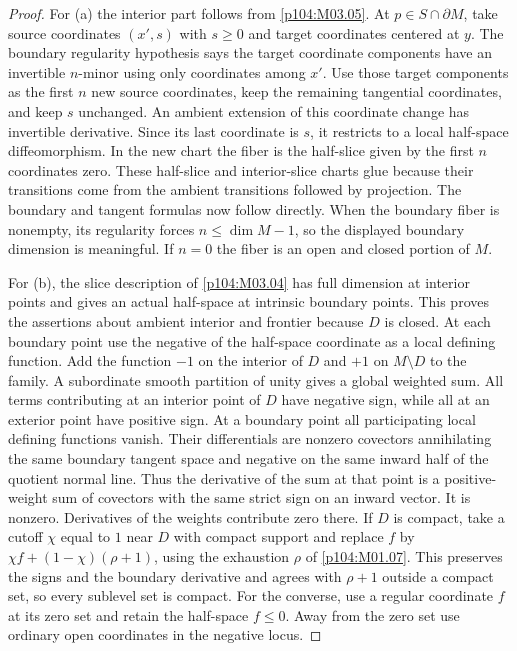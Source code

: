 \documentclass[11pt,oneside,openany]{book}
\theoremstyle{definition}
\theoremstyle{remark}
\begin{document}
\begin{proof}
For (a) the interior part follows from
\cref{p104:M03.05}. At \(p\in S\cap\partial M\),
take source coordinates \((x',s)\) with \(s\geq0\)
and target coordinates centered at \(y\). The
boundary regularity hypothesis says the target
coordinate components have an invertible
\(n\)-minor using only coordinates among \(x'\).
Use those target components as the first \(n\)
new source coordinates, keep the remaining
tangential coordinates, and keep \(s\) unchanged.
An ambient extension of this coordinate change
has invertible derivative. Since its last
coordinate is \(s\), it restricts to a local
half-space diffeomorphism. In the new chart
the fiber is the half-slice given by the first
\(n\) coordinates zero. These half-slice and
interior-slice charts glue because their
transitions come from the ambient transitions
followed by projection. The boundary and
tangent formulas now follow directly. When
the boundary fiber is nonempty, its regularity
forces \(n\leq\dim M-1\), so the displayed
boundary dimension is meaningful. If \(n=0\)
the fiber is an open and closed portion of \(M\).

For (b), the slice description of
\cref{p104:M03.04} has full dimension at interior
points and gives an actual half-space at intrinsic
boundary points. This proves the assertions about
ambient interior and frontier because \(D\) is
closed. At each boundary point use the negative
of the half-space coordinate as a local defining
function. Add the function \(-1\) on the interior
of \(D\) and \(+1\) on \(M\setminus D\) to the
family. A subordinate smooth partition of unity
gives a global weighted sum. All terms contributing
at an interior point of \(D\) have negative sign, while
all at an exterior point have positive sign.
At a boundary point all participating local
defining functions vanish. Their differentials
are nonzero covectors annihilating the same
boundary tangent space and negative on the same
inward half of the quotient normal line.
Thus the derivative of the sum at that point
is a positive-weight sum of covectors with
the same strict sign on an inward vector. It
is nonzero. Derivatives of the weights contribute
zero there. If \(D\) is compact, take a cutoff
\(\chi\) equal to \(1\) near \(D\) with compact
support and replace \(f\) by
\(\chi f+(1-\chi)(\rho+1)\), using the exhaustion
\(\rho\) of \cref{p104:M01.07}. This preserves
the signs and the boundary derivative and
agrees with \(\rho+1\) outside a compact set,
so every sublevel set is compact. For the
converse, use a regular coordinate \(f\) at
its zero set and retain the half-space \(f\leq0\).
Away from the zero set use ordinary open
coordinates in the negative locus.
\end{proof}
\end{document}
